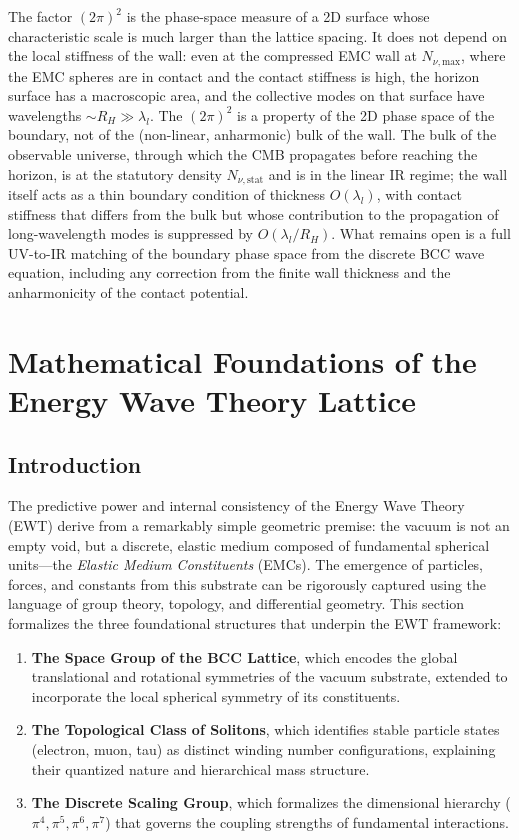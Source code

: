 \documentclass[10pt,a4paper]{article}
\begin{document}
The factor \((2\pi)^2\) is the phase-space measure of a 2D surface
whose characteristic scale is much larger than the lattice spacing.
It does not depend on the local stiffness of the wall: even at the
compressed EMC wall at \(N_{\nu,\text{max}}\), where the EMC spheres are in
contact and the contact stiffness is high, the horizon surface has a
macroscopic area, and the collective modes on that surface have
wavelengths \(\sim R_H \gg \lambda_l\). The \((2\pi)^2\) is a
property of the 2D phase space of the boundary, not of the
(non-linear, anharmonic) bulk of the wall. The bulk of the
observable universe, through which the CMB propagates before
reaching the horizon, is at the statutory density
\(N_{\nu,\text{stat}}\) and is in the linear IR regime; the wall itself
acts as a thin boundary condition of thickness \(O(\lambda_l)\),
with contact stiffness that differs from the bulk but whose
contribution to the propagation of long-wavelength modes is
suppressed by \(O(\lambda_l/R_H)\). What remains open is a full
UV-to-IR matching of the boundary phase space from the discrete BCC
wave equation, including any correction from the finite wall
thickness and the anharmonicity of the contact potential.

\section{Mathematical Foundations of the Energy Wave Theory Lattice}

\subsection{Introduction}
The predictive power and internal consistency of the Energy Wave Theory (EWT) derive from a remarkably simple geometric premise: the vacuum is not an empty void, but a discrete, elastic medium composed of fundamental spherical units---the \textit{Elastic Medium Constituents} (EMCs). The emergence of particles, forces, and constants from this substrate can be rigorously captured using the language of group theory, topology, and differential geometry. This section formalizes the three foundational structures that underpin the EWT framework:
\begin{enumerate}
	\item \textbf{The Space Group of the BCC Lattice}, which encodes the global translational and rotational symmetries of the vacuum substrate, extended to incorporate the local spherical symmetry of its constituents.
	\item \textbf{The Topological Class of Solitons}, which identifies stable particle states (electron, muon, tau) as distinct winding number configurations, explaining their quantized nature and hierarchical mass structure.
	\item \textbf{The Discrete Scaling Group}, which formalizes the dimensional hierarchy ($\pi^4, \pi^5, \pi^6, \pi^7$) that governs the coupling strengths of fundamental interactions.
\end{enumerate}
\end{document}
